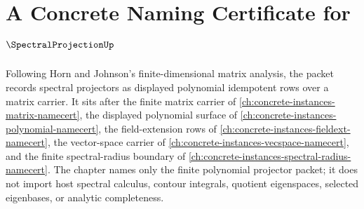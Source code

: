 \chapter{A Concrete Naming Certificate for $\SpectralProjectionUp$}
\label{ch:concrete-instances-spectral-projection-namecert}

Following Horn and Johnson's finite-dimensional matrix analysis, the packet records spectral projectors as displayed polynomial idempotent rows over a matrix carrier. It sits after the finite matrix carrier of \autoref{ch:concrete-instances-matrix-namecert}, the displayed polynomial surface of \autoref{ch:concrete-instances-polynomial-namecert}, the field-extension rows of \autoref{ch:concrete-instances-fieldext-namecert}, the vector-space carrier of \autoref{ch:concrete-instances-vecspace-namecert}, and the finite spectral-radius boundary of \autoref{ch:concrete-instances-spectral-radius-namecert}. The chapter names only the finite polynomial projector packet; it does not import host spectral calculus, contour integrals, quotient eigenspaces, selected eigenbases, or analytic completeness.


